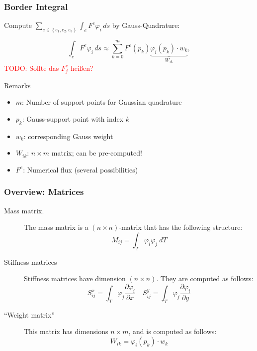 \documentclass{beamer}
\newcommand{\todo}[1]{\textcolor{red}{TODO: #1}}
\newcommand{\pd}[2]{\dfrac{\partial #1}{\partial #2}}
\renewcommand{\phi}{\varphi}
\begin{document}
\begin{frame}
    \frametitle{Border Integral}
    Compute $\sum_{e\in\left\{ e_1,e_2,e_3 \right\}} \int_{e} F^e \phi_i \, ds$ by Gauss-Quadrature:

\begin{equation}
  \int_{e} F^e \phi_i \, ds \approx \sum_{k=0}^{m} F^e(p_k) \underbrace{\phi_i(p_k) \cdot w_k}_{W_{ik}},
\end{equation}
\todo{Sollte das $F^e_j$ heißen?}
\begin{block}{Remarks}
  \begin{itemize}
  \item $m$: Number of support points for Gaussian quadrature
  \item $p_k$: Gauss-support point with index $k$
  \item $w_k$: corresponding Gauss weight
  \item $W_{ik}$: $n\times m$ matrix; can be pre-computed!
  \item $F^e$: Numerical flux (several possibilities)
  \end{itemize}
\end{block}
    
\end{frame}

\begin{frame}
  \frametitle{Overview: Matrices}
  \begin{description}
  \item[Mass matrix.] The mass matrix is a $(n\times n)$-matrix that has the following structure:
    \begin{equation}
      \label{eq:mass-matrix-overview}
      M_{ij} = \int_T \phi_i \phi_j \ dT
    \end{equation}
  \item[Stiffness matrices] Stiffness matrices have dimension $(n\times n)$. They are computed as follows:
    \begin{equation}
      \label{eq:stiffness-matrix-overview}
      S^x_{ij} = \int_T \phi_j \pd{\phi_i}{x} \quad
      S^y_{ij} = \int_T \phi_j \pd{\phi_i}{y}
    \end{equation}
  \item[``Weight matrix''] This matrix has dimensions $n\times m$, and is computed as follows:
    \begin{equation}
      \label{eq:edge-matrix}
      W_{ik} = \phi_i(p_k)\cdot w_k
    \end{equation}
  \end{description}
\end{frame}
\end{document}
